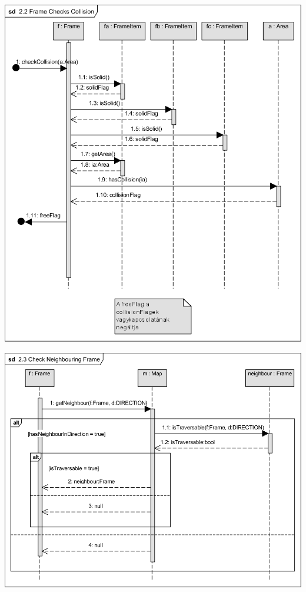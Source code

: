 		\begin{center}\includegraphics[scale=1]{resources/22FrameChecksCollision.png}\end{center}
		\begin{center}\includegraphics[scale=1]{resources/23CheckNeighbouringFrame.png}\end{center}
